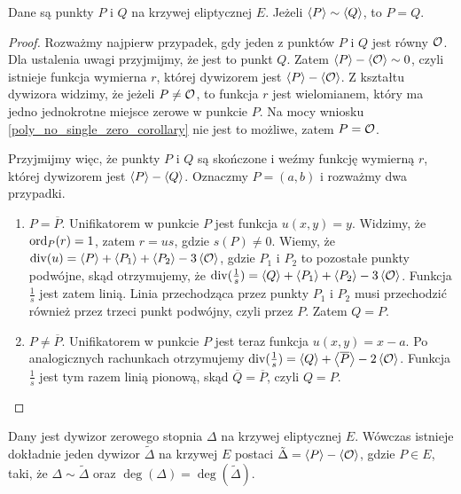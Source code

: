 \begin{lemma}\label{sim_pq_eq_pq_lemma}
Dane są punkty $P$ i $Q$ na krzywej eliptycznej $E$.
Jeżeli $\left\langle P\right\rangle \sim \left\langle Q\right\rangle$,
to $P = Q$.
\end{lemma}

\begin{proof}
Rozważmy najpierw przypadek,
gdy jeden z punktów $P$ i $Q$ jest równy $\mathcal{O}$.
Dla ustalenia uwagi przyjmijmy, że jest to punkt $Q$.
Zatem $\left\langle P\right\rangle - \left\langle\mathcal{O}\right\rangle \sim 0$,
czyli istnieje funkcja wymierna $r$,
której dywizorem jest $\left\langle P\right\rangle - \left\langle\mathcal{O}\right\rangle$.
Z kształtu dywizora widzimy, że jeżeli $P \neq \mathcal{O}$, to funkcja $r$
jest wielomianem, który ma jedno jednokrotne miejsce zerowe w punkcie $P$.
Na mocy wniosku \ref{poly_no_single_zero_corollary} nie jest to możliwe,
zatem $P = \mathcal{O}$.

\noindent
Przyjmijmy więc, że punkty $P$ i $Q$ są skończone
i weźmy funkcję wymierną $r$, której dywizorem jest $\left\langle P\right\rangle - \left\langle Q\right\rangle$.
Oznaczmy $P = (a, b)$ i rozważmy dwa przypadki.
\begin{enumerate}
\item $P = \overline{P}$.
Unifikatorem w punkcie $P$ jest funkcja $u(x, y) = y$.
Widzimy, że $\operatorname{ord}_P(r) = 1$, zatem $r = us$, gdzie $s(P) \neq 0$.
Wiemy, że $\operatorname{div}(u) = \left\langle P\right\rangle + \left\langle P_1\right\rangle + \left\langle P_2\right\rangle - 3\left\langle\mathcal{O}\right\rangle$,
gdzie $P_1$ i $P_2$ to pozostałe punkty podwójne,
skąd otrzymujemy, że
$\operatorname{div}(\frac{1}{s}) = \left\langle Q\right\rangle + \left\langle P_1\right\rangle + \left\langle P_2\right\rangle - 3\left\langle\mathcal{O}\right\rangle$.
Funkcja $\frac{1}{s}$ jest zatem linią.
Linia przechodząca przez punkty $P_1$ i $P_2$ musi przechodzić również przez
trzeci punkt podwójny, czyli przez $P$. Zatem $Q = P$.
\item $P \neq \overline{P}$.
Unifikatorem w punkcie $P$ jest teraz funkcja $u(x, y) = x - a$.
Po analogicznych rachunkach otrzymujemy
$\operatorname{div}(\frac{1}{s}) = \left\langle Q\right\rangle + \left\langle\overline{P}\right\rangle - 2\left\langle\mathcal{O}\right\rangle$.
Funkcja $\frac{1}{s}$ jest tym razem linią pionową,
skąd $\overline{Q} = \overline{P}$, czyli $Q = P$.
\end{enumerate}
\end{proof}

\begin{theorem}\label{zerodeg_divisor_linear_reduction_theorem}
Dany jest dywizor zerowego stopnia $\Delta$ na krzywej eliptycznej $E$.
Wówczas istnieje dokładnie jeden dywizor $\tilde{\Delta}$ na krzywej $E$
postaci $\tilde{\Delta} = \left\langle P\right\rangle - \left\langle\mathcal{O}\right\rangle$, gdzie $P \in E$, taki,
że $\Delta \sim \tilde{\Delta}$ oraz $\deg(\Delta) = \deg(\tilde{\Delta})$.
\end{theorem}

